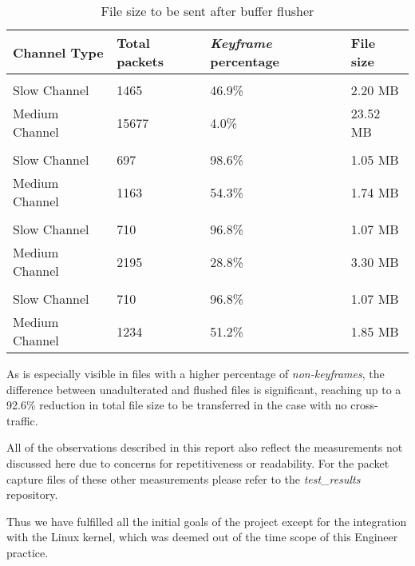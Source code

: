 \begin{table}[htbp]
\break
\setlength{\arrayrulewidth}{1mm}
\setlength{\tabcolsep}{12pt}
\renewcommand{\arraystretch}{1.5}
 {
\begin{tabular}{ |p{3cm}|p{3cm}|p{3cm}|p{3cm}| }
\hline
Channel Type&Total packets&\textit{Keyframe} percentage & File size\\
\hline
\rowcolor{white}\multicolumn{4}{|c|}{Video traces before flushing} \\
\hline
Slow Channel&1465&46.9\%&2.20 MB\\
Medium Channel&15677&4.0\%&23.52 MB\\
\hline
\rowcolor{white}\multicolumn{4}{|c|}{No cross-traffic} \\
\hline
Slow Channel&697&98.6\%&1.05 MB\\
Medium Channel&1163&54.3\%&1.74 MB\\
\hline
\rowcolor{white}\multicolumn{4}{|c|}{Random cross-traffic} \\
\hline
Slow Channel&710&96.8\%&1.07 MB\\
Medium Channel&2195&28.8\%&3.30 MB\\
\hline
\rowcolor{white}\multicolumn{4}{|c|}{Sample cross-traffic} \\
\hline
Slow Channel&710&96.8\%&1.07 MB\\
Medium Channel&1234&51.2\%&1.85 MB\\
\hline
\end{tabular}
}
\caption{File size to be sent after buffer flusher}
\end{table}

As is especially visible in files with a higher percentage of \textit{non-keyframes}, the difference between unadulterated and flushed files is significant, reaching up to a 92.6\% reduction in total file size to be transferred in the case with no cross-traffic.

All of the observations described in this report also reflect the measurements not discussed here due to concerns for repetitiveness or readability. For the packet capture files of these other measurements please refer to the \textit{test\_results} repository.

Thus we have fulfilled all the initial goals of the project except for the integration with the Linux kernel, which was deemed out of the time scope of this Engineer practice.
